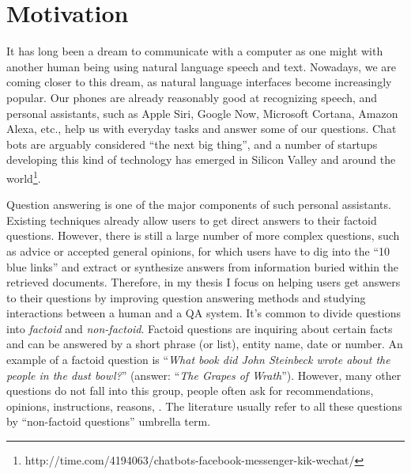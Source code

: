 %
%
\label{chapter:intro}

\setcounter{page}{1}
\pagestyle{myheadings}


\newtheorem{definition}{Definition}
\newtheorem{proposition}{Proposition}


\section{Motivation}

It has long been a dream to communicate with a computer as one might with another human being using natural language speech and text.
Nowadays, we are coming closer to this dream, as natural language interfaces become increasingly popular.
Our phones are already reasonably good at recognizing speech, and personal assistants, such as Apple Siri, Google Now, Microsoft Cortana, Amazon Alexa, etc., help us with everyday tasks and answer some of our questions.
Chat bots are arguably considered ``the next big thing'', and a number of startups developing this kind of technology has emerged in Silicon Valley and around the world\footnote{http://time.com/4194063/chatbots-facebook-messenger-kik-wechat/}.

Question answering is one of the major components of such personal assistants.
Existing techniques already allow users to get direct answers to their factoid questions.
However, there is still a large number of more complex questions, such as advice or accepted general opinions, for which users have to dig into the ``10 blue links'' and extract or synthesize answers from information buried within the retrieved documents.
Therefore, in my thesis I focus on helping users get answers to their questions by improving question answering methods and studying interactions between a human and a QA system.
It's common to divide questions into \textit{factoid} and \textit{non-factoid}.
Factoid questions are inquiring about certain facts and can be answered by a short phrase (or list), \ie entity name, date or number.
An example of a factoid question is ``\textit{What book did John Steinbeck wrote about the people in the dust bowl?}'' (answer: ``\textit{The Grapes of Wrath}'').
However, many other questions do not fall into this group, \ie people often ask for recommendations, opinions, instructions, reasons, \etc.
The literature usually refer to all these questions by ``non-factoid questions'' umbrella term.

